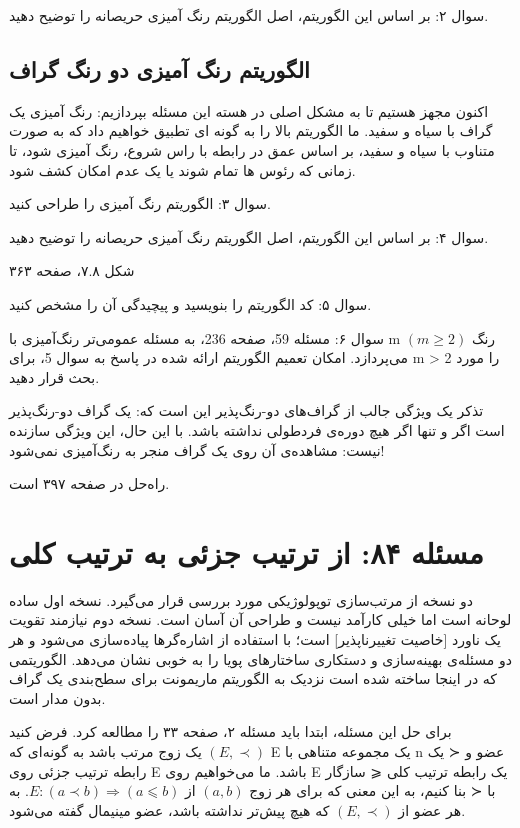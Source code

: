 \documentclass{book} %
\begin{document}
سوال ۲: بر اساس این الگوریتم، اصل الگوریتم رنگ آمیزی حریصانه را توضیح دهید.

\subsection*{الگوریتم رنگ آمیزی دو رنگ گراف}

اکنون مجهز هستیم تا به مشکل اصلی در هسته این مسئله بپردازیم: رنگ آمیزی یک گراف با سیاه و سفید. ما الگوریتم بالا را به گونه ای تطبیق خواهیم داد که به صورت متناوب با سیاه و سفید، بر اساس عمق در رابطه با راس شروع، رنگ آمیزی شود، تا زمانی که رئوس ها تمام شوند یا یک عدم امکان کشف شود.

سوال ۳: الگوریتم رنگ آمیزی را طراحی کنید.

سوال ۴: بر اساس این الگوریتم، اصل الگوریتم رنگ آمیزی حریصانه را توضیح دهید.

شکل ۷.۸، صفحه ۳۶۳

سوال ۵: کد الگوریتم را بنویسید و پیچیدگی آن را مشخص کنید.

سوال ۶: مسئله 59، صفحه 236، به مسئله عمومی‌تر رنگ‌آمیزی با m رنگ $(m ≥ 2)$ می‌پردازد.
امکان تعمیم الگوریتم ارائه شده در پاسخ به سوال 5، برای m > 2 را مورد بحث قرار دهید.

تذکر
یک ویژگی جالب از گراف‌های دو-رنگ‌پذیر این است که: یک گراف دو-رنگ‌پذیر است اگر و تنها اگر هیچ دوره‌ی فردطولی نداشته باشد. با این حال، این ویژگی سازنده نیست: مشاهده‌ی آن روی یک گراف منجر به رنگ‌آمیزی نمی‌شود!

راه‌حل در صفحه ۳۹۷ است.

\newpage

\section {مسئله ۸۴: از ترتیب جزئی به ترتیب کلی}

دو نسخه از مرتب‌سازی توپولوژیکی مورد بررسی قرار می‌گیرد. نسخه اول ساده لوحانه است
اما خیلی کارآمد نیست و طراحی آن آسان است. نسخه دوم نیازمند تقویت یک ناورد [خاصیت
تغییرناپذیر] است؛ با استفاده از اشاره‌گرها پیاده‌سازی می‌شود و هر دو مسئله‌ی بهینه‌سازی و
دستکاری ساختارهای پویا را به خوبی نشان می‌دهد. الگوریتمی که در اینجا ساخته شده است
نزدیک به الگوریتم ماریمونت برای سطح‌بندی یک گراف بدون مدار است.

برای حل این مسئله، ابتدا باید مسئله ۲، صفحه ۳۳ را مطالعه کرد.
فرض کنید $(E, ≺)$ یک زوج مرتب باشد به گونه‌ای که E یک مجموعه متناهی با n عضو
و ≺ یک رابطه ترتیب جزئی روی E باشد. ما می‌خواهیم روی E یک رابطه ترتیب کلی
⩽ سازگار با ≺ بنا کنیم، به این معنی که برای هر زوج $(a, b)$ از $E: (a ≺ b) ⇒ (a ⩽ b)$.
به هر عضو از $(E, ≺)$ که هیچ پیش‌تر نداشته باشد، عضو مینیمال گفته می‌شود.
\end{document}
